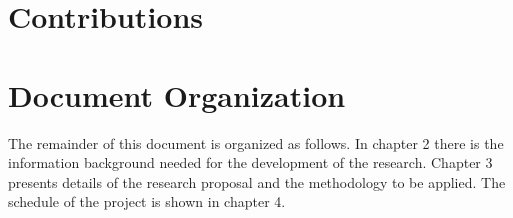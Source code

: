 \section{Contributions}

\section{Document Organization}

The remainder of this document is organized as follows. In chapter 2 there is the information background needed for the development of the research. Chapter 3 presents details of the research proposal and the methodology to be applied. The schedule of the project is shown in chapter 4. 